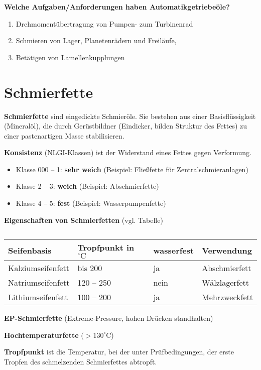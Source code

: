 \textbf{Welche Aufgaben/Anforderungen haben Automatikgetriebeöle?}

\begin{enumerate}
\item
  Drehmomentübertragung von Pumpen- zum Turbinenrad
\item
  Schmieren von Lager, Planetenrädern und Freiläufe,
\item
  Betätigen von Lamellenkupplungen
\end{enumerate}

\section{Schmierfette}\label{schmierfette}

\textbf{Schmierfette} sind eingedickte Schmieröle. Sie bestehen aus
einer Basisflüssigkeit (Mineralöl), die durch Gerüstbildner (Eindicker,
bilden Struktur des Fettes) zu einer pastenartigen Masse stabilisieren.

\textbf{Konsistenz} (NLGI-Klassen) ist der Widerstand eines Fettes gegen
Verformung.

\begin{itemize}
\item
  Klasse 000 -- 1: \textbf{sehr weich} (Beispiel: Fließfette für
  Zentralschmieranlagen)
\item
  Klasse 2 -- 3: \textbf{weich} (Beispiel: Abschmierfette)
\item
  Klasse 4 -- 5: \textbf{fest} (Beispiel: Wasserpumpenfette)
\end{itemize}

\textbf{Eigenschaften von Schmierfetten} (vgl. Tabelle)

\begin{table}[!ht]%
\centering 
	\caption{}%
\begin{tabular}{@{}llll@{}}
\hline
\textbf{Seifenbasis} & \textbf{Tropfpunkt} in $^\circ\text{C}$ &
\textbf{wasserfest} & \textbf{Verwendung} \\
\hline
Kalziumseifenfett & bis 200 & ja & Abschmierfett \\
Natriumseifenfett & 120 -- 250 & nein & Wälzlagerfett \\
Lithiumseifenfett & 100 -- 200 & ja & Mehrzweckfett \\
\hline
\end{tabular} 
\end{table}

\textbf{EP-Schmierfette} (Extreme-Pressure, hohen Drücken standhalten)

\textbf{Hochtemperaturfette} ($> 130^\circ\text{C}$)

\textbf{Tropfpunkt} ist die Temperatur, bei der unter Prüfbedingungen,
der erste Tropfen des schmelzenden Schmierfettes abtropft.
